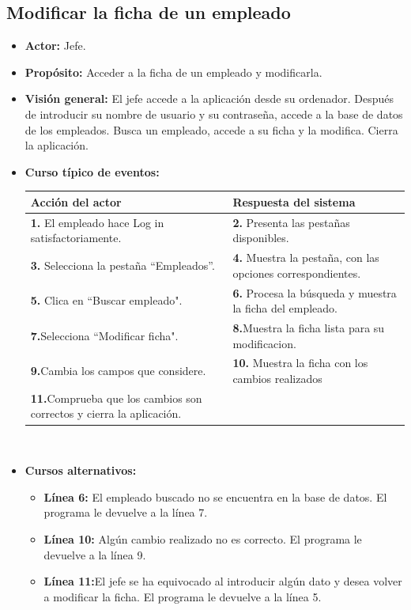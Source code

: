 \documentclass[spanish,a4paper,11pt, twoside]{report}	%
\begin{document}
	\subsection{Modificar la ficha de un empleado}		
			\begin{itemize}
			\item \textbf{Actor:} Jefe.
			\item \textbf{Propósito:} Acceder a la ficha de un empleado y modificarla.
			\item \textbf{Visión general:} El jefe accede a la aplicación desde su ordenador. Después de introducir su nombre de usuario y su contraseña, accede a la base de datos de los empleados. Busca un empleado, accede a su ficha y la modifica. Cierra la aplicación. 
	\newpage
			\item \textbf{Curso típico de eventos:} 	\\
				\begin{tabular}{|p{6cm}||p{6cm}|}
				\hline
				\textbf{Acción del actor} & \textbf{Respuesta del sistema} \\ \hline \hline
				\textbf{1.}   El empleado hace Log in satisfactoriamente. & \textbf{2.} Presenta las pestañas disponibles.\\ \hline
				\textbf{3.} Selecciona la pestaña “Empleados”. & \textbf{4.} Muestra la pestaña, con las opciones correspondientes. \\ \hline
				\textbf{5.} Clica en “Buscar empleado".	& \textbf{6.} Procesa la búsqueda y muestra la ficha del empleado. \\ \hline
				\textbf{7.}Selecciona “Modificar ficha". & \textbf{8.}Muestra la ficha lista para su modificacion.\\ \hline
				\textbf{9.}Cambia los campos que considere. & \textbf{10.} Muestra la ficha con los cambios realizados \\ \hline
				\textbf{11.}Comprueba que los cambios son correctos y cierra la aplicación. & \textbf{} \\ \hline
			\end{tabular}
			\\
			\item \textbf{Cursos alternativos:} 
			\begin{itemize}
			\item  \textbf{Línea 6:} El empleado buscado no se encuentra en la base de datos. El programa le devuelve a la línea 7.
			\item  \textbf{Línea 10:} Algún cambio realizado no es correcto. El programa le devuelve a la línea 9.
			\item  \textbf{Línea 11:}El jefe se ha equivocado al introducir algún dato y desea volver a modificar la ficha. El programa le devuelve a la línea 5.
			
			\end {itemize}
		\end{itemize}%
\end{document}
